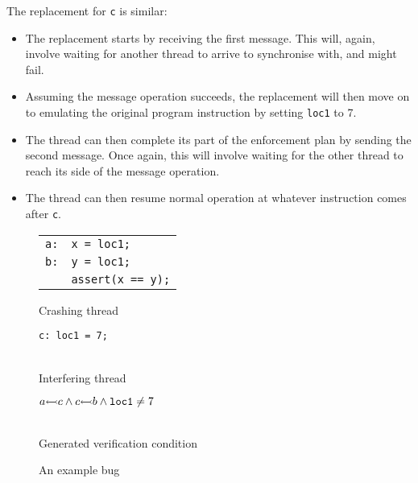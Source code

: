 The replacement for {\tt c} is similar:

\begin{itemize}
\item The replacement starts by receiving the first message.  This
  will, again, involve waiting for another thread to arrive to
  synchronise with, and might fail.
\item Assuming the message operation succeeds, the replacement will
  then move on to emulating the original program instruction by
  setting {\tt loc1} to 7.
\item The thread can then complete its part of the enforcement plan by
  sending the second message.  Once again, this will involve waiting
  for the other thread to reach its side of the message operation.
\item The thread can then resume normal operation at whatever
  instruction comes after {\tt c}.
\end{itemize}

\begin{figure}
  \begin{subfloat}
    \parbox{4cm}{
      \begin{tabular}{ll}
        {\tt a:} & {\tt x = loc1;}\\
        {\tt b:} & {\tt y = loc1;}\\
        & {\tt assert(x == y);}
      \end{tabular}
    }
    \caption{Crashing thread}
  \end{subfloat}
  \begin{subfloat}
    \parbox{4cm}{\tt c: loc1 = 7;}\\
    \caption{Interfering thread}
  \end{subfloat}
  \begin{subfloat}
    \parbox{4cm}{$a {\leftarrowtail} c \wedge c {\leftarrowtail} b \wedge \mathtt{loc1} \not= 7$}\\
    \caption{Generated verification condition}
  \end{subfloat}
  \caption{An example bug}
  \label{fig:enforcement:example_bug}
\end{figure}

